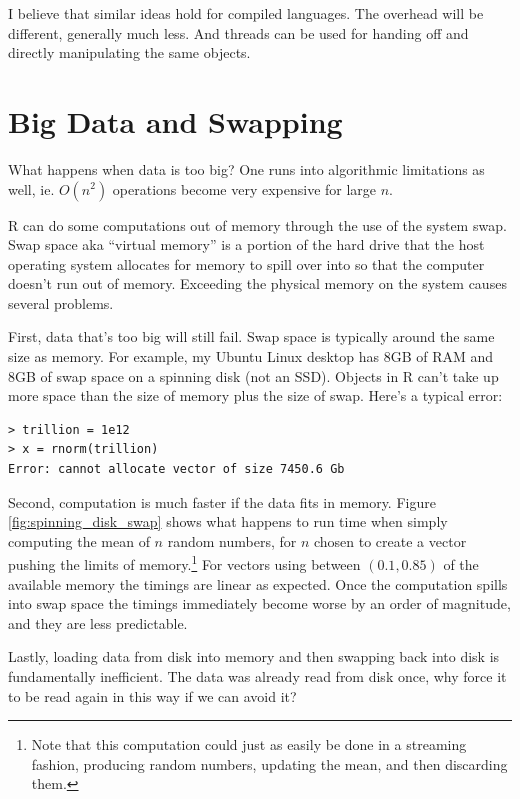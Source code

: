 \documentclass[12pt]{article}
\begin{document}
I believe that similar ideas hold for compiled languages. The overhead will
be different, generally much less. And threads can be used for handing off
and directly manipulating the same objects.

\section{Big Data and Swapping}

What happens when data is too big? One runs into algorithmic limitations as
well, ie. $O(n^2)$ operations become very expensive for large $n$.

R can do some computations out of memory through the use of the system
swap. Swap space aka ``virtual memory'' is a portion of the hard drive that
the host operating system allocates for memory to spill over into so that
the computer doesn't run out of memory.  Exceeding the physical memory on
the system causes several problems.

First, data that's too big will still fail. Swap space is typically
around the same size as memory. For example, my Ubuntu Linux desktop has
8GB of RAM and 8GB of swap space on a spinning disk (not an SSD). Objects
in R can't take up more space than the size of memory plus the size of
swap. Here's a typical error:

\begin{verbatim}
> trillion = 1e12
> x = rnorm(trillion)
Error: cannot allocate vector of size 7450.6 Gb
\end{verbatim}

Second, computation is much faster if the data fits in memory.
Figure \ref{fig:spinning_disk_swap} shows what happens to run time when
simply computing the mean of $n$ random numbers, for $n$ chosen to create a
vector pushing the limits of memory.\footnote{Note that this computation
could just as easily be done in a streaming fashion, producing random
numbers, updating the mean, and then discarding them.} For vectors using between $(0.1, 0.85)$
of the available memory the timings are linear as expected.
Once the computation spills into swap space the timings immediately become
worse by an order of magnitude, and they are less predictable.

Lastly, loading data from disk into memory and then swapping back into disk
is fundamentally inefficient. The data was already read from disk once, why force it
to be read again in this way if we can avoid it?
\end{document}
